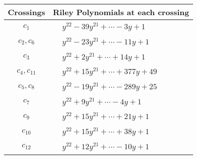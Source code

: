 \documentclass[1p]{elsarticle_modified}
\theoremstyle{definition}
\begin{document}
\begin{tabular}{m{50pt}|m{274pt}}
Crossings & \hspace{64pt}Riley Polynomials at each crossing \\
\hline $$\begin{aligned}c_{1}\end{aligned}$$&$\begin{aligned}
&y^{22}-39 y^{21}+\cdots-3 y+1
\end{aligned}$\\
\hline $$\begin{aligned}c_{2},c_{6}\end{aligned}$$&$\begin{aligned}
&y^{22}-23 y^{21}+\cdots-11 y+1
\end{aligned}$\\
\hline $$\begin{aligned}c_{3}\end{aligned}$$&$\begin{aligned}
&y^{22}+2 y^{21}+\cdots+14 y+1
\end{aligned}$\\
\hline $$\begin{aligned}c_{4},c_{11}\end{aligned}$$&$\begin{aligned}
&y^{22}+15 y^{21}+\cdots+377 y+49
\end{aligned}$\\
\hline $$\begin{aligned}c_{5},c_{8}\end{aligned}$$&$\begin{aligned}
&y^{22}-19 y^{21}+\cdots-289 y+25
\end{aligned}$\\
\hline $$\begin{aligned}c_{7}\end{aligned}$$&$\begin{aligned}
&y^{22}+9 y^{21}+\cdots-4 y+1
\end{aligned}$\\
\hline $$\begin{aligned}c_{9}\end{aligned}$$&$\begin{aligned}
&y^{22}+15 y^{21}+\cdots+21 y+1
\end{aligned}$\\
\hline $$\begin{aligned}c_{10}\end{aligned}$$&$\begin{aligned}
&y^{22}+15 y^{21}+\cdots+38 y+1
\end{aligned}$\\
\hline $$\begin{aligned}c_{12}\end{aligned}$$&$\begin{aligned}
&y^{22}+12 y^{21}+\cdots-10 y+1
\end{aligned}$\\
\hline
\end{tabular}\\~\\
\end{document}
